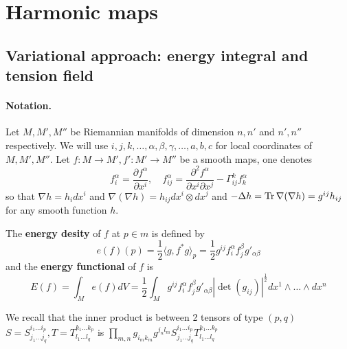 \section{Harmonic maps}
\label{sec:org29d0638}
\subsection{Variational approach: energy integral and tension field}
\label{sec:org56d0c24}
\paragraph{Notation.}
\label{sec:orgaf42f2d}
Let \(M, M', M''\) be Riemannian manifolds of dimension \(n, n'\) and \(n', n''\)
respectively. We will use \(i,j,k,\dots, \alpha,\beta,\gamma,\dots, a,b,c\) for local
coordinates of \(M, M', M''\).
Let \(f: M \longrightarrow M', f': M' \longrightarrow M''\) be a smooth maps, one denotes
\[
f^\alpha_i = \frac{\partial f^\alpha}{\partial x^i},\quad f^\alpha_{ij} =
\frac{\partial^2 f^\alpha}{\partial x^i \partial x^j} - \Gamma_{ij}^k f^{\alpha}_k \]
so that \(\nabla h = h_i dx^i\) and \(\nabla (\nabla h) = h_{ij}dx^i\otimes dx^j\) and
\(-\Delta h = \mathop{\rm Tr}\nolimits \nabla (\nabla h) = g^{ij}h_{ij}\) for any smooth function \(h\).


\begin{definition}
The \textbf{energy desity} of \(f\) at \(p\in m\) is defined by
\[
e(f)(p) = \frac{1}{2}\langle g, f^*g \rangle_p = \frac{1}{2}g^{ij}f^\alpha_i
f^\beta_j g'_{\alpha\beta}
\]
and the \textbf{energy functional} of \(f\) is
\[
E(f) = \int_M e(f) dV = \frac{1}{2}\int_M g^{ij}f^\alpha_i
f^\beta_j g'_{\alpha\beta} |\det (g_{ij})|^\frac{1}{2} dx^1\wedge \dots\wedge dx^n
\]
\end{definition}

We recall that the inner product is between 2 tensors of type \((p,q)\) \(S =
S^{i_1\dots i_p}_{j_1\dots j_q}, T = T^{k_1\dots k_p}_{l_1\dots l_q}\) is \(\prod_{m,n}
g_{i_m k_m} g^{j_n l_m}S^{i_1\dots i_p}_{j_1\dots j_q} T^{k_1\dots k_p}_{l_1\dots l_q}\)

